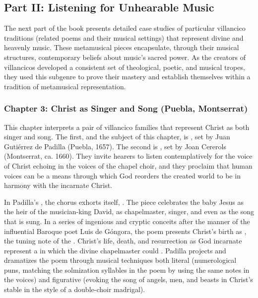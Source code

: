 \documentclass{vcbook-proposal}
\begin{document}
\subsection{Part II: Listening for Unhearable Music}

The next part of the book presents detailed case studies of particular 
villancico traditions (related poems and their musical settings) that represent 
divine and heavenly music.
These metamusical pieces encapsulate, through their musical structures, 
contemporary beliefs about music's sacred power.
As the creators of villancicos developed a consistent set of theological, 
poetic, and musical tropes, they used this subgenre to prove their mastery and 
establish themselves within a tradition of metamusical representation.

\subsubsection{Chapter 3: Christ as Singer and Song (Puebla, Montserrat)}

This chapter interprets a pair of villancico families that represent Christ as
both singer and song.
The first, and the subject of this chapter, is , set by Juan Gutiérrez de Padilla (Puebla, 1657).
The second is , set by Joan 
Cererols (Montserrat, ca. 1660).
They invite hearers to listen contemplatively for the voice of Christ echoing 
in the voices of the chapel choir, and they proclaim that human voices can be a 
means through which God reorders the created world to be in harmony with the 
incarnate Christ.

In Padilla's , the chorus exhorts itself, .
The piece celebrates the baby Jesus as the heir of the musician-king David, as 
chapelmaster, singer, and even as the song that is sung.
In a series of ingenious and cryptic conceits after the manner of the 
influential Baroque poet Luis de Góngora, the poem presents Christ's birth as 
, the tuning note of the 
.
Christ's life, death, and resurrection as God incarnate represent a 
 in which the divine chapelmaster could .
Padilla projects and dramatizes the poem through musical techniques both 
literal (numerological puns, matching the solmization syllables in the poem by 
using the same notes in the voices) and figurative (evoking the song of angels, 
men, and beasts in Christ's stable in the style of a double-choir madrigal).
\end{document}
